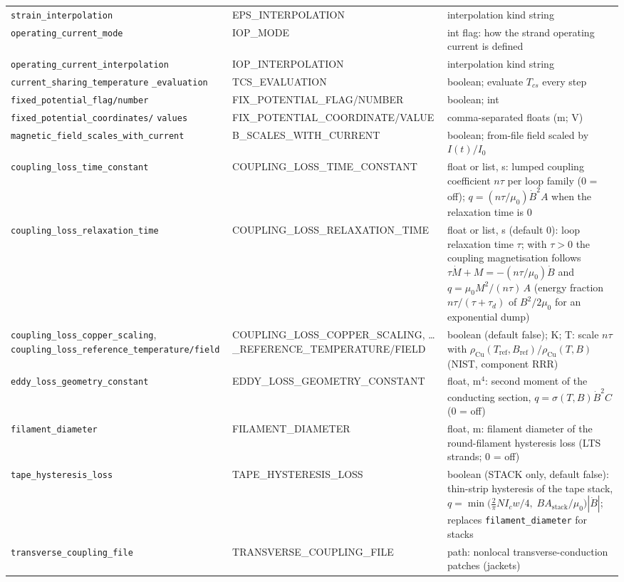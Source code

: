 \documentclass[10pt,a4paper]{article}
\newcommand{\code}[1]{\texttt{#1}}
\begin{document}
\begin{longtable}{p{5.6cm}p{3.4cm}p{6.2cm}}
\code{strain\_interpolation} & EPS\_INTERPOLATION & interpolation kind string \\
\code{operating\_current\_mode} & IOP\_MODE & int flag: how the strand operating current is defined \\
\code{operating\_current\_interpolation} & IOP\_INTERPOLATION & interpolation kind string \\
\code{current\_sharing\_temperature} \code{\_evaluation} & TCS\_EVALUATION & boolean; evaluate $T_{cs}$ every step \\
\code{fixed\_potential\_flag/number} & FIX\_POTENTIAL\_FLAG/NUMBER & boolean; int \\
\code{fixed\_potential\_coordinates/} \code{values} & FIX\_POTENTIAL\_COORDINATE/VALUE & comma-separated floats (m; V) \\
\code{magnetic\_field\_scales\_with\_current} & B\_SCALES\_WITH\_CURRENT & boolean; from-file field scaled by $I(t)/I_0$ \\
\code{coupling\_loss\_time\_constant} & COUPLING\_LOSS\_TIME\_CONSTANT & float or list, s: lumped coupling coefficient $n\tau$ per loop family (0 = off); $q = (n\tau/\mu_0)\dot B^2 A$ when the relaxation time is 0 \\
\code{coupling\_loss\_relaxation\_time} & COUPLING\_LOSS\_RELAXATION\_TIME & float or list, s (default 0): loop relaxation time $\tau$; with $\tau>0$ the coupling magnetisation follows $\tau\dot M + M = -(n\tau/\mu_0)\dot B$ and $q=\mu_0 M^2/(n\tau)\,A$ (energy fraction $n\tau/(\tau+\tau_d)$ of $B^2/2\mu_0$ for an exponential dump) \\
\code{coupling\_loss\_copper\_scaling}, \code{coupling\_loss\_reference\_temperature/field} & COUPLING\_LOSS\_COPPER\_SCALING, \dots\_REFERENCE\_TEMPERATURE/FIELD & boolean (default false); K; T: scale $n\tau$ with $\rho_{\mathrm{Cu}}(T_{\mathrm{ref}},B_{\mathrm{ref}})/\rho_{\mathrm{Cu}}(T,B)$ (NIST, component RRR) \\
\code{eddy\_loss\_geometry\_constant} & EDDY\_LOSS\_GEOMETRY\_CONSTANT & float, m$^4$: second moment of the conducting section, $q=\sigma(T,B)\dot B^2 C$ (0 = off) \\
\code{filament\_diameter} & FILAMENT\_DIAMETER & float, m: filament diameter of the round-filament hysteresis loss (LTS strands; 0 = off) \\
\code{tape\_hysteresis\_loss} & TAPE\_HYSTERESIS\_LOSS & boolean (STACK only, default false): thin-strip hysteresis of the tape stack, $q=\min\!\big(\tfrac{2}{\pi}N I_c w/4,\; B A_{\mathrm{stack}}/\mu_0\big)|\dot B|$; replaces \code{filament\_diameter} for stacks \\
\code{transverse\_coupling\_file} & TRANSVERSE\_COUPLING\_FILE & path: nonlocal transverse-conduction patches (jackets) \\
\bottomrule
\end{longtable}
\end{document}
